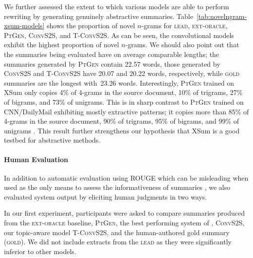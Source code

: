 We further assessed the extent to which various models are able to
perform rewriting by generating genuinely abstractive
summaries. Table~\ref{tab:novelngram-xsum-models} shows the proportion
of novel $n$-grams for \textsc{lead}, \textsc{ext-oracle},
\textsc{PtGen}, \textsc{ConvS2S}, and \textsc{T-ConvS2S}.  As can be
seen, the convolutional models exhibit the highest proportion of novel
$n$-grams. We should also point out that the summaries being evaluated
have on average comparable lengths; the summaries generated by
\textsc{PtGen} contain 22.57 words, those generated by
\textsc{ConvS2S} and \textsc{T-ConvS2S} have 20.07 and 20.22 words,
respectively, while \textsc{gold} summaries are the longest with~23.26
words.  Interestingly, \textsc{PtGen} trained on XSum only copies 4\%
of 4-grams in the source document, 10\% of trigrams, 27\% of bigrams,
and 73\% of unigrams. This is in sharp contrast to \textsc{PtGen}
trained on CNN/DailyMail exhibiting mostly extractive patterns; it
copies more than 85\% of 4-grams in the source document, 90\% of
trigrams, 95\% of bigrams, and 99\% of unigrams \cite{see-acl17}. This
result further strengthens our hypothesis that XSum is a good testbed
for abstractive methods.



\paragraph{Human Evaluation}
In addition to automatic evaluation using ROUGE which can be
misleading when used as the only means to assess the informativeness
of summaries \cite{schluter:2017:EACLshort}, we also evaluated system
output by eliciting human judgments in two ways. 

In our first experiment, participants were asked to compare summaries
produced from the \textsc{ext-oracle} baseline, \textsc{PtGen}, the
best performing system of \citet{see-acl17}, \textsc{ConvS2S}, our
topic-aware model \textsc{T-ConvS2S}, and the human-authored gold
summary (\textsc{gold}). We did not include extracts from the
\textsc{lead} as they were significantly inferior to other models. 


